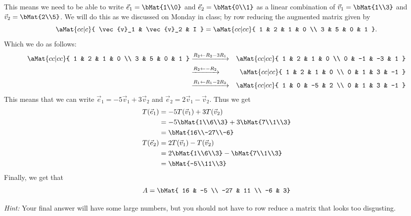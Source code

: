 \documentclass[12pt,addpoints,answers]{exam}
\begin{document}
\begin{questions}
\begin{solution}
        This means we need to be able to write $\vec{e}_1 = \bMat{1\\0}$ and $\vec{e}_2 = \bMat{0\\1}$
        as a linear combination of $\vec{v}_1 = \bMat{1\\3}$ and $\vec{v}_2 = \bMat{2\\5}$. We will
        do this as we discussed on Monday in class; by row reducing the augmented matrix given by
        \[
            \aMat{cc|c}{ \vec{v}_1 & \vec{v}_2 & I } = \aMat{cc|cc}{
                1 & 2 & 1 & 0 \\
                3 & 5 & 0 & 1
            }.
        \]
        Which we do as follows:
        \begin{eqnarray*}
            \aMat{cc|cc}{
                1 & 2 & 1 & 0 \\
                3 & 5 & 0 & 1
            } &\xrightarrow{R_2\gets R_2 - 3R_1}& \aMat{cc|cc}{
                1 & 2 & 1 & 0 \\
                0 & -1 & -3 & 1
            }\\
            &\xrightarrow{R_2\gets -R_2}&\aMat{cc|cc}{
                1 & 2 & 1 & 0 \\
                0 & 1 & 3 & -1
            } \\
            &\xrightarrow{R_1\gets R_1 - 2R_2}&\aMat{cc|cc}{
                1 & 0 & -5 & 2 \\
                0 & 1 & 3 & -1
            }
        \end{eqnarray*}
        This means that we can write
        $\vec{e}_1 = -5\vec{v}_1 + 3\vec{v}_2$ and $\vec{e}_2 = 2\vec{v}_1 - \vec{v}_2$. Thus we get
        \begin{align*}
            T(\vec{e}_1) &= -5T(\vec{v}_1) + 3T(\vec{v}_2) \\
            &= -5\bMat{1\\6\\3} + 3\bMat{7\\1\\3} \\
            &= \bMat{16\\-27\\-6}\\
            T(\vec{e}_2) &= 2T(\vec{v}_1) - T(\vec{v}_2) \\
            &= 2\bMat{1\\6\\3} - \bMat{7\\1\\3} \\
            &= \bMat{-5\\11\\3}
        \end{align*}
        Finally, we get that
        \[
            A = \bMat{ 16 & -5 \\ -27 & 11 \\ -6 & 3}
        \]
    \end{solution}
    \emph{Hint:} Your final answer will have some large numbers, but you should not have to row reduce
    a matrix that looks too disgusting.
    \newpage

\end{questions}
\end{document}
